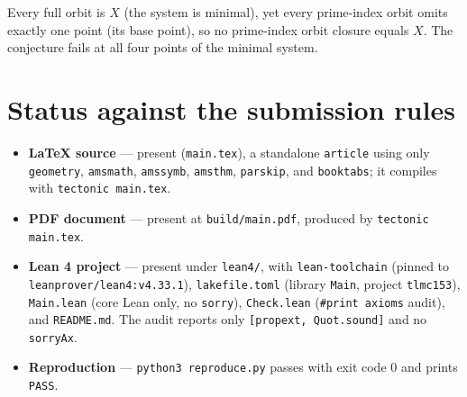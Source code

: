 \documentclass[11pt]{article}
\theoremstyle{definition}
\theoremstyle{remark}
\begin{document}
Every full orbit is $X$ (the system is minimal), yet every prime-index orbit
omits exactly one point (its base point), so no prime-index orbit closure equals
$X$. The conjecture fails at all four points of the minimal system.

\section{Status against the submission rules}

\begin{itemize}
\item \textbf{LaTeX source} --- present (\texttt{main.tex}), a standalone
\texttt{article} using only \texttt{geometry}, \texttt{amsmath},
\texttt{amssymb}, \texttt{amsthm}, \texttt{parskip}, and \texttt{booktabs}; it
compiles with \texttt{tectonic main.tex}.
\item \textbf{PDF document} --- present at \texttt{build/main.pdf}, produced by
\texttt{tectonic main.tex}.
\item \textbf{Lean 4 project} --- present under \texttt{lean4/}, with
\texttt{lean-toolchain} (pinned to \texttt{leanprover/lean4:v4.33.1}),
\texttt{lakefile.toml} (library \texttt{Main}, project \texttt{tlmc153}),
\texttt{Main.lean} (core Lean only, no \texttt{sorry}), \texttt{Check.lean}
(\texttt{\#print axioms} audit), and \texttt{README.md}. The audit reports only
\texttt{[propext, Quot.sound]} and no \texttt{sorryAx}.
\item \textbf{Reproduction} --- \texttt{python3 reproduce.py} passes with exit
code $0$ and prints \texttt{PASS}.
\end{itemize}
\end{document}

